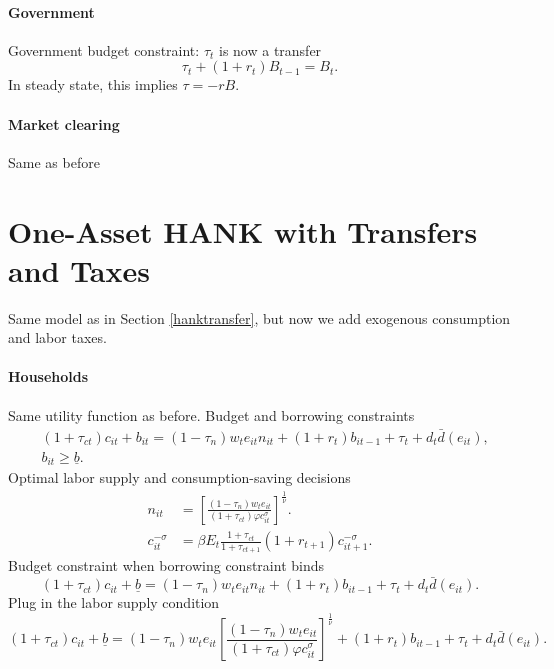 \documentclass[11pt,a4paper]{article}
\begin{document}
\paragraph{Government} Government budget constraint: $\tau_t$ is now a transfer
\begin{equation*}
\tau_t+(1+r_t)B_{t-1}=B_t.
\end{equation*}
In steady state, this implies $\tau=-rB$.

\paragraph{Market clearing} Same as before




\section{One-Asset HANK with Transfers and Taxes}
\label{hanktax}
Same model as in Section \ref{hanktransfer}, but now we add exogenous consumption and labor taxes.


\paragraph{Households}
Same utility function as before. Budget and borrowing constraints
\begin{align*}
&(1+\tau_{ct})c_{it}+b_{it}=(1-\tau_{n})w_te_{it}n_{it}+(1+r_t)b_{it-1}+\tau_t+d_t\bar{d}(e_{it}),\\
&b_{it}\geq\underline{b}.
\end{align*}
Optimal labor supply and consumption-saving decisions
\begin{align*}
n_{it}&=\left[\frac{(1-\tau_n)w_te_{it}}{(1+\tau_{ct})\varphi c_{it}^{\sigma}}\right]^{\frac{1}{\nu}}.\\
c_{it}^{-\sigma}&=\beta E_t\frac{1+\tau_{ct}}{1+\tau_{ct+1}}(1+r_{t+1})c_{it+1}^{-\sigma}.
\end{align*}
Budget constraint when borrowing constraint binds
\begin{equation*}
(1+\tau_{ct})c_{it}+\underline{b}=(1-\tau_n)w_te_{it}n_{it}+(1+r_t)b_{it-1}+\tau_t+d_t\bar{d}(e_{it}).
\end{equation*}
Plug in the labor supply condition
\begin{equation*}
(1+\tau_{ct})c_{it}+\underline{b}=(1-\tau_n)w_te_{it}\left[\frac{(1-\tau_n)w_te_{it}}{(1+\tau_{ct})\varphi c_{it}^{\sigma}}\right]^{\frac{1}{\nu}}+(1+r_t)b_{it-1}+\tau_t+d_t\bar{d}(e_{it}).
\end{equation*}
\end{document}
